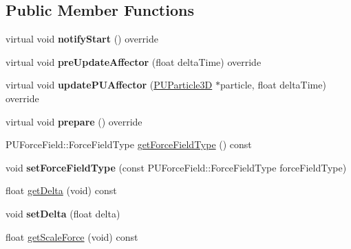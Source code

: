 \subsection*{Public Member Functions}
\begin{DoxyCompactItemize}
\item 
\mbox{\label{classPUForceFieldAffector_ab9872bdc27eb2299f130116c733e5efb}} 
virtual void {\bfseries notify\+Start} () override
\item 
\mbox{\label{classPUForceFieldAffector_a9c4cc2ad5605eb365a5e8a3619fdd89b}} 
virtual void {\bfseries pre\+Update\+Affector} (float delta\+Time) override
\item 
\mbox{\label{classPUForceFieldAffector_a6db49bc24b19982d49c52beb19ae5fa4}} 
virtual void {\bfseries update\+P\+U\+Affector} (\hyperlink{structPUParticle3D}{P\+U\+Particle3D} $\ast$particle, float delta\+Time) override
\item 
\mbox{\label{classPUForceFieldAffector_ab05ddeb14621f5b6bda1b7fac5368bbc}} 
virtual void {\bfseries prepare} () override
\item 
P\+U\+Force\+Field\+::\+Force\+Field\+Type \hyperlink{classPUForceFieldAffector_a6972445d36658e3b8db5829353924058}{get\+Force\+Field\+Type} () const
\item 
\mbox{\label{classPUForceFieldAffector_a76ff701e22aa954df11bb42185eacc4b}} 
void {\bfseries set\+Force\+Field\+Type} (const P\+U\+Force\+Field\+::\+Force\+Field\+Type force\+Field\+Type)
\item 
float \hyperlink{classPUForceFieldAffector_a0ba6d06fe458c53af34742842a6e4c79}{get\+Delta} (void) const
\item 
\mbox{\label{classPUForceFieldAffector_a0ec85118ac42194edfc575a9992dd994}} 
void {\bfseries set\+Delta} (float delta)
\item 
float \hyperlink{classPUForceFieldAffector_a12af699397b6e69920660b1c6a269d6b}{get\+Scale\+Force} (void) const
\item 
\mbox{\label{classPUForceFieldAffector_a1ace43e77384d03a6bcbac0c7d4f9adf}} 

\end{DoxyCompactItemize}
